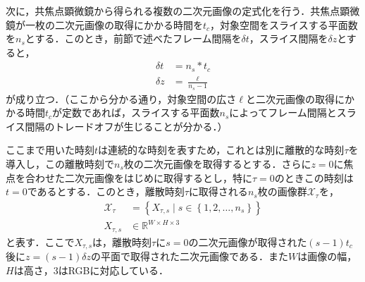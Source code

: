 次に，共焦点顕微鏡から得られる複数の二次元画像の定式化を行う．共焦点顕微鏡が一枚の二次元画像の取得にかかる時間を$t_c$，対象空間をスライスする平面数を$n_s$とする．このとき，前節で述べたフレーム間隔を$\delta t$，スライス間隔を$\delta z$とすると，
\begin{equation}
    \label{eq:delta_time_and_z}
    \begin{aligned}
        \delta t &= n_s * t_c
        \\ \delta z &= \frac{\ell}{n_s - 1}
    \end{aligned}
\end{equation}
が成り立つ．（ここから分かる通り，対象空間の広さ$\ell$と二次元画像の取得にかかる時間$t_c$が定数であれば，スライスする平面数$n_s$によってフレーム間隔とスライス間隔のトレードオフが生じることが分かる．）

ここまで用いた時刻$t$は連続的な時刻を表すため，これとは別に離散的な時刻$\tau$を導入し，この離散時刻で$n_s$枚の二次元画像を取得するとする．さらに$z = 0$に焦点を合わせた二次元画像をはじめに取得するとし，特に$\tau = 0$のときこの時刻は$t = 0$であるとする．このとき，離散時刻$\tau$に取得される$n_s$枚の画像群$\mathcal{X}_{\tau}$を，
\begin{equation}
    \label{eq:sliced_images}
    \begin{aligned}
        \mathcal{X}_{\tau} &= \left\{X_{\tau, s} \mid s \in \left\{1, 2, \dots, n_s\right\}\right\}
        \\ X_{\tau, s} &\in \mathbb{R}^{W \times H \times 3}
    \end{aligned}
\end{equation}
と表す．ここで$X_{\tau, s}$は，離散時刻$\tau$に$s = 0$の二次元画像が取得された$(s - 1) t_c$後に$z = (s - 1) \delta z$の平面で取得された二次元画像である．また$W$は画像の幅，$H$は高さ，$3$はRGBに対応している．


